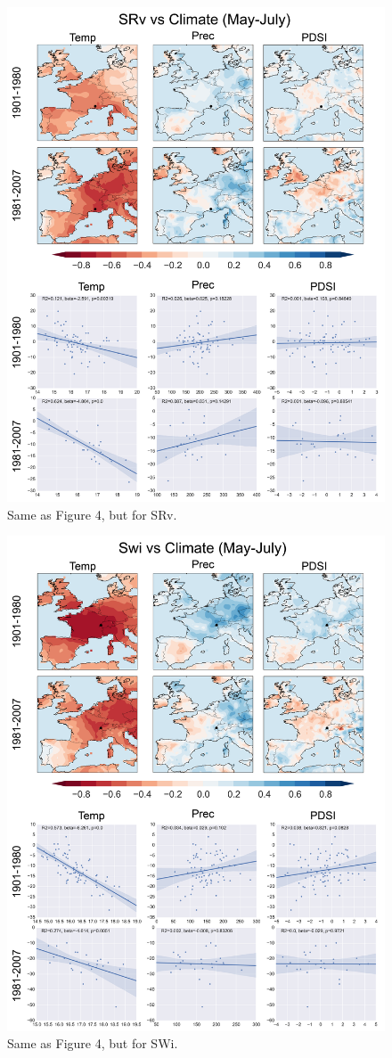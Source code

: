 \documentclass[12pt]{article}
\begin{document}
\begin{figure}
\center
\includegraphics[width=.9\columnwidth,scale=2]{SUPP_fig_09_SRv_MJJ_climate.png}
\caption{Same as Figure 4, but for SRv.}
\end{figure}

\begin{figure}
\center
\includegraphics[width=.9\columnwidth,scale=2]{SUPP_fig_10_SWi_MJJ_climate.png}
\caption{Same as Figure 4, but for SWi.}
\end{figure}
\end{document}
